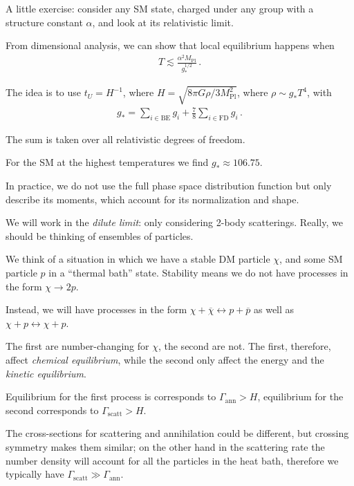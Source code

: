 \documentclass[main.tex]{subfiles}
\begin{document}
\begin{extracontent}
A little exercise: consider any SM state, charged under any group with a structure constant \(\alpha \),
and look at its relativistic limit. 

From dimensional analysis, we can show that local equilibrium happens when 
%
\begin{align}
T \lesssim \frac{\alpha^2 M _{\text{Pl}}}{g_*^{1/2}}
\,.
\end{align}

The idea is to use \(t_U = H^{-1}\), where \(H = \sqrt{8 \pi G \rho / 3 M _{\text{Pl}}^2}\), 
where \(\rho \sim g_* T^4\), with 
%
\begin{align}
g_* = \sum _{i \in \text{BE}} g_i + \frac{7}{8} \sum _{i \in \text{FD}} g_i
\,.
\end{align}

The sum is taken over all relativistic degrees of freedom. 

For the SM at the highest temperatures we find \(g_* \approx 106.75\). 
\end{extracontent}

In practice, we do not use the full phase space distribution function but 
only describe its moments, which account for its normalization and shape. 

We will work in the \emph{dilute limit}: only considering 2-body scatterings. 
Really, we should be thinking of ensembles of particles. 

We think of a situation in which we have a stable DM particle \(\chi \), and 
some SM particle \(p\) in a ``thermal bath'' state. 
Stability means we do not have processes in the form \(\chi \to 2 p\). 

Instead, we will have processes in the form \(\chi + \overline{\chi} \leftrightarrow p + \overline{p} \)
as well as \(\chi + p \leftrightarrow \chi + p\). 

The first are number-changing for \(\chi \), the second are not. 
The first, therefore, affect \emph{chemical equilibrium},
while the second only affect the energy and the \emph{kinetic equilibrium}. 

Equilibrium for the first process is corresponds to \(\Gamma _{\text{ann}} > H\), 
equilibrium for the second corresponds to \(\Gamma _{\text{scatt}} > H\). 

The cross-sections for scattering and annihilation could be different, 
but crossing symmetry makes them similar; on the other hand in the scattering
rate the number density will account for all the particles in the heat bath, 
therefore we typically have \(\Gamma _{\text{scatt}} \gg \Gamma _{\text{ann}}\). 
\end{document}
